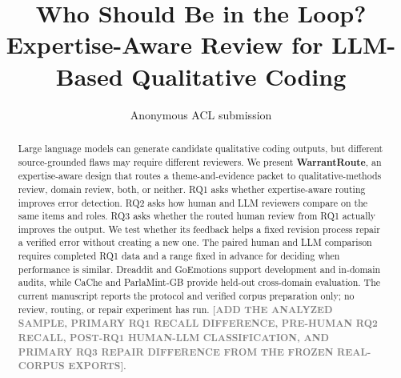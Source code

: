 \documentclass[11pt]{article}
\title{Who Should Be in the Loop?\\
Expertise-Aware Review for LLM-Based Qualitative Coding}
\author{Anonymous ACL submission}
\newif\ifpredatadraft
\newcommand{\fillin}[1]{\textcolor{gray}{\textbf{[#1]}}}
\begin{document}
\maketitle

\begin{abstract}
Large language models can generate candidate qualitative coding outputs, but different source-grounded flaws may require different reviewers. We present \textbf{WarrantRoute}, an expertise-aware design that routes a theme-and-evidence packet to qualitative-methods review, domain review, both, or neither. RQ1 asks whether expertise-aware routing improves error detection. RQ2 asks how human and LLM reviewers compare on the same items and roles. RQ3 asks whether the routed human review from RQ1 actually improves the output. We test whether its feedback helps a fixed revision process repair a verified error without creating a new one. The paired human and LLM comparison requires completed RQ1 data and a range fixed in advance for deciding when performance is similar. Dreaddit and GoEmotions support development and in-domain audits, while CaChe and ParlaMint-GB provide held-out cross-domain evaluation. The current manuscript reports the protocol and verified corpus preparation only; no review, routing, or repair experiment has run. \fillin{ADD THE ANALYZED SAMPLE, PRIMARY RQ1 RECALL DIFFERENCE, PRE-HUMAN RQ2 RECALL, POST-RQ1 HUMAN-LLM CLASSIFICATION, AND PRIMARY RQ3 REPAIR DIFFERENCE FROM THE FROZEN REAL-CORPUS EXPORTS}.
\end{abstract}

\ifpredatadraft
\begin{center}
\small\itshape Manuscript skeleton: gray fields and blank table cells must be replaced from the frozen analysis export.
\end{center}
\fi



\clearpage


\appendix

\end{document}
